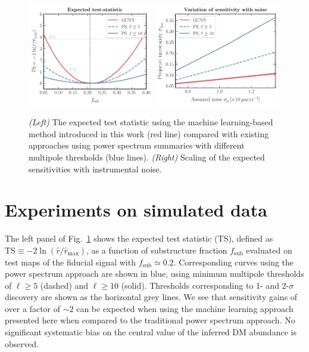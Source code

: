 \documentclass[]{article}
\begin{document}
\begin{figure}[!htbp]
\centering
\includegraphics[width=0.49\textwidth]{figures/TS}
\includegraphics[width=0.49\textwidth]{figures/noise_var}
\caption{\emph{(Left)} The expected test statistic using the machine learning-based method introduced in this work (red line) compared with existing approaches using power spectrum summaries with different multipole thresholds (blue lines). \emph{(Right)} Scaling of the expected sensitivities with instrumental noise.}
\label{fig:experiment}
\end{figure}
 

\section{Experiments on simulated data}
\label{sec:experiments}

The left panel of Fig.~\ref{fig:experiment} shows the expected test statistic (TS), defined as $\mathrm{TS} \equiv -2\ln(\hat r / \hat r_\mathrm{max})$, as a function of substructure fraction $f_\mathrm{sub}$ evaluated on test maps of the fiducial signal with $f_\mathrm{sub} \simeq 0.2$. Corresponding curves using the power spectrum approach are shown in blue, using minimum multipole thresholds of $\ell \geq 5$ (dashed) and $\ell \geq 10$ (solid). Thresholds corresponding to 1- and 2-$\sigma$ discovery are shown as the horizontal grey lines. We see that sensitivity gains of over a factor of $\sim 2$ can be expected when using the machine learning approach presented here when compared to the traditional power spectrum approach. No significant systematic bias on the central value of the inferred DM abundance is observed.
\end{document}

